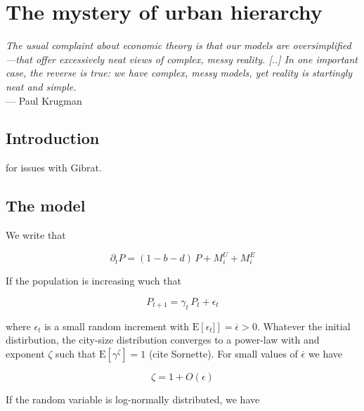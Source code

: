 %
\chapter{The mystery of urban hierarchy}
\label{sec:concepts}

\begin{flushright}{\slshape    
The usual complaint about economic theory is that our models are
oversimplified---that offer excessively neat views of complex, messy reality.
[..] In one important case, the reverse is true: we have complex, messy models,
yet reality is startingly neat and simple.
} \\ \medskip
--- Paul Krugman~\cite{Krugman:1996}
\end{flushright}

\section{Introduction}
\label{sec:introduction}

\cite{Krugman:1996}
\cite{Gabaix:1999}
\cite{Batty:2013} for issues with Gibrat.
\cite{Cristelli:2012}
\cite{Batty:2006}

\section{The model}
\label{sec:the_model}


We write that 

\begin{equation}
    \partial_t P = \left(1-b-d\right)\,P + M_i^U + M_i^E
\end{equation} 

If the population is increasing wuch that

\begin{equation}
    P_{t+1} = \gamma_t\,P_t + \epsilon_t
\end{equation}

where $\epsilon_t$ is a small random increment with
$\mathrm{E}\left[\epsilon_t]\right] = \overline{\epsilon} > 0$. Whatever the
initial distirbution, the city-size distribution converges to a power-law with
and exponent $\zeta$ such that $\mathrm{E}\left[\gamma^\zeta\right] = 1$ (cite
Sornette). For small values of $\overline{\epsilon}$ we have

\begin{equation}
    \zeta = 1 + O(\epsilon)
\end{equation}

If the random variable is log-normally distributed, we have

